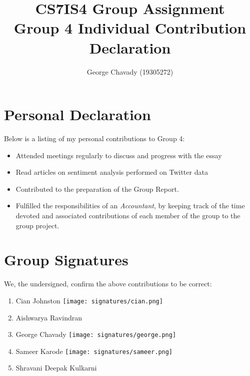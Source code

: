 \documentclass[a4paper,10pt]{article}
\begin{document}
\title{
    CS7IS4 Group Assignment \\
    \large Group 4 Individual Contribution Declaration
}
\author{
    George Chavady (19305272)
}

\maketitle

\section{Personal Declaration}

Below is a listing of my personal contributions to Group 4:

\begin{itemize}
    \item {Attended meetings regularly to discuss and progress with the essay}
    \item {Read articles on sentiment analysis performed on Twitter data }
    \item{
       Contributed to the preparation of the Group Report.
    }
    \item{
        Fulfilled the responsibilities of an \textit{Accountant}, by keeping track of the time devoted and associated contributions of each member of the group to the group project.
    }
\end{itemize}

\section{Group Signatures}

We, the undersigned, confirm the above contributions to be correct:

\begin{enumerate}
    \item{
        Cian Johnston \texttt{[image: signatures/cian.png]}
    }
    \item{
        Aishwarya Ravindran
    }
    \item{
        George Chavady \texttt{[image: signatures/george.png]}
    }
    \item{
        Sameer Karode \texttt{[image: signatures/sameer.png]}
    }
    \item{
        Shravani Deepak Kulkarni
    }

\end{enumerate}
\end{document}
